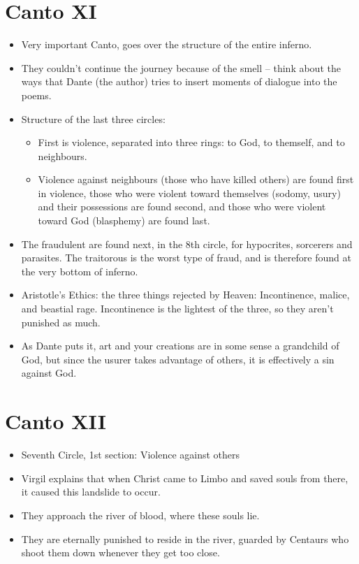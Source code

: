 \documentclass[10pt]{article}
\begin{document}
	\section{Canto XI}
	\begin{itemize}
		\item Very important Canto, goes over the structure of the entire inferno.
		\item They couldn't continue the journey because of the smell -- think about the ways that Dante (the 
			author) tries to insert moments of dialogue into the poems.  
		\item Structure of the last three circles:
			\begin{itemize}
				\item First is violence, separated into three rings: to God, to themself, and to neighbours.
				\item Violence against neighbours (those who have killed others) are found first in violence, 
					those who were violent toward 
					themselves (sodomy, usury) and their possessions are found second, and those who were 
					violent toward God (blasphemy) are found last. 
			\end{itemize}
		\item The fraudulent are found next, in the 8th circle, for hypocrites, sorcerers and parasites. The 
			traitorous is the worst type of fraud, and is therefore found at the very bottom of inferno.
		\item Aristotle's Ethics: the three things rejected by Heaven: Incontinence, malice, and beastial 
			rage. Incontinence is the lightest of the three, so they aren't punished as much.
		\item As Dante puts it, art and your creations are in some sense a grandchild of God, but since 
			the usurer takes advantage of others, it is effectively a sin against God.  
	\end{itemize}
	\section{Canto XII}
	\begin{itemize}
		\item Seventh Circle, 1st section: Violence against others
		\item Virgil explains that when Christ came to Limbo and saved souls from there, it caused this 
			landslide to occur. 
		\item They approach the river of blood, where these souls lie.
		\item They are eternally punished to reside in the river, guarded by Centaurs who shoot them down 
			whenever they get too close.
	\end{itemize}
\end{document}
